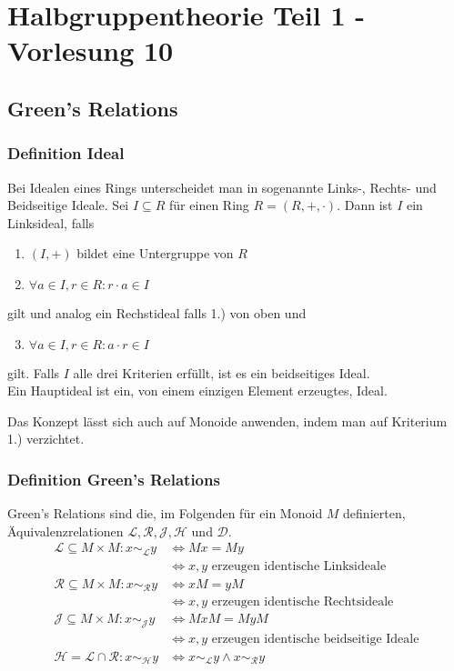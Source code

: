 \documentclass[12pt, german]{article}
\newcommand{\grel}{\sim_{\mathcal{L}}}
\newcommand{\grer}{\sim_{\mathcal{R}}}
\newcommand{\grej}{\sim_{\mathcal{J}}}
\newcommand{\greh}{\sim_{\mathcal{H}}}
\begin{document}
	\section{Halbgruppentheorie Teil 1 - Vorlesung 10}
	\subsection{Green's Relations}
	\subsubsection{Definition Ideal}
	Bei Idealen eines Rings unterscheidet man in sogenannte Links-, Rechts- und Beidseitige Ideale. 
	Sei $I \subseteq R$ für einen Ring $R=(R,+,\cdot)$. Dann ist $I$ ein Linksideal, falls 
	\begin{enumerate}[label= \arabic*.)]
		\item $(I, +)$ bildet eine Untergruppe von $R$ 
		\item $\forall a \in I, r \in R : r \cdot a \in I  $
	\end{enumerate}
	gilt und analog ein Rechstideal falls 1.) von oben und
	\begin{enumerate}[label= \arabic*.)]
		\setcounter{enumi}{2}
		\item $\forall a \in I, r \in R : a \cdot r \in I  $
	\end{enumerate}
	gilt.
	Falls $I$ alle drei Kriterien erfüllt, ist es ein beidseitiges Ideal.\\
	Ein Hauptideal ist ein, von einem einzigen Element erzeugtes, Ideal.
	\newline
	
	Das Konzept lässt sich auch auf Monoide anwenden, indem man auf Kriterium 1.) verzichtet.
	\subsubsection{Definition Green's Relations}	
	Green's Relations sind die, im Folgenden für ein Monoid $M$ definierten, Äquivalenzrelationen $\mathcal{L,R, J, H}$ und $\mathcal{D}$. 
	\begin{align*}
		\mathcal L \subseteq M \times M: x \grel y &\iff Mx = My \\ 
		&\iff x,y \text{ erzeugen identische Linksideale} \\
		\mathcal R \subseteq M \times M: x \grer y &\iff xM = yM  \\ 
		&\iff x,y \text{ erzeugen identische Rechtsideale} \\
		\mathcal J \subseteq M \times M: x \grej y &\iff MxM = MyM \\ 
		&\iff x,y \text{ erzeugen identische beidseitige Ideale} \\
		\mathcal H = \mathcal L \cap \mathcal R: x \greh y &\iff x \grel y \wedge x \grer y
	\end{align*}
	\newline
	
\end{document}
